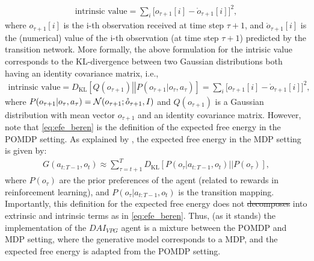 \documentclass[twoside,11pt]{article}
\let\oldmathcal\mathcal
\renewcommand{\mathcal}[1]{%
  \IfSubStr{ABCDEFGHIJKLMNOPQRSTUVWXYZ}{#1}{\oldmathcal{#1}}{\mathdutchcal{#1}}
}
\newcommand{\kl}[2]{D_{\mathrm{KL}} \left[ \left. \left. #1 \right|\right| #2 \right] }
\providecommand{\DIFadd}[1]{{\protect\color{blue}\uwave{#1}}} %
\providecommand{\DIFdel}[1]{{\protect\color{red}\sout{#1}}}                      %
\providecommand{\DIFaddbegin}{} %
\providecommand{\DIFaddend}{} %
\providecommand{\DIFdelbegin}{} %
\providecommand{\DIFdelend}{} %
\begin{document}
\begin{align}
\text{intrinsic value} = \sum_{i} \Big[ o_{\tau+1}[i] - \mathring{o}_{\tau+1}[i] \Big]^2, \label{eq:intrisic_values}
\end{align}
where $o_{\tau+1}[i]$ is the i-th observation received at time step $\tau + 1$, and $\mathring{o}_{\tau+1}[i]$ is the (numerical) value of the i-th observation (at time step $\tau + 1$) predicted by the transition network. More formally, the above formulation for the intrisic value corresponds to the KL-divergence between two Gaussian distributions both having an identity covariance matrix, i.e.,
\begin{align*}
\text{intrinsic value} = \kl{Q(o_{\tau+1})}{P(o_{\tau+1}|o_\tau, a_\tau)} = \sum_{i} \Big[ o_{\tau+1}[i] - \mathring{o}_{\tau+1}[i] \Big]^2,
\end{align*}
where $P(o_{\tau+1}|o_\tau, a_\tau) = \mathcal{N}(o_{\tau+1};\mathring{o}_{\tau+1},I)$ and $Q(o_{\tau+1})$ is a Gaussian distribution with mean vector $o_{\tau+1}$ and an identity covariance matrix. However, note that \eqref{eq:efe_beren} is the definition of the expected free energy in the POMDP setting. As explained by \citet{dacosta2020relationship}, the expected free energy in the MDP setting is given by:
\begin{align*}
G(a_{t:T-1},o_t) \approx \sum_{\tau = t+1}^T \kl{P(o_\tau|a_{t:T-1}, o_t)}{P(o_\tau)},
\end{align*}
where $P(o_\tau)$ are the prior preferences of the agent (related to rewards in reinforcement learning), and $P(o_\tau |a_{t:T-1}, o_t)$ is the transition mapping. Importantly, this definition for the expected free energy does not \DIFdelbegin \DIFdel{decomposes }\DIFdelend \DIFaddbegin \DIFadd{decompose }\DIFaddend into extrinsic and intrinsic terms as in \eqref{eq:efe_beren}. Thus, (as it stands) the implementation of the $DAI_{VPG}$ agent is a mixture between the POMDP and MDP setting, where the generative model corresponds to a MDP, and the expected free energy is adapted from the POMDP setting.
\end{document}

